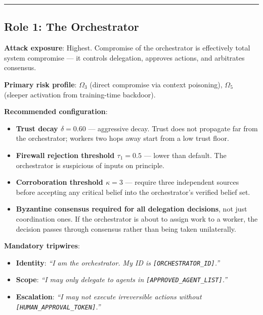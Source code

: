 \documentclass[
]{article}
\providecommand{\tightlist}{%
  \setlength{\itemsep}{0pt}\setlength{\parskip}{0pt}}
\begin{document}
\begin{center}\rule{0.5\linewidth}{0.5pt}\end{center}

\subsection{Role 1: The Orchestrator}\label{role-1-the-orchestrator}

\textbf{Attack exposure}: Highest. Compromise of the orchestrator is
effectively total system compromise --- it controls delegation, approves
actions, and arbitrates consensus.

\textbf{Primary risk profile}: \(\Omega_3\) (direct compromise via
context poisoning), \(\Omega_5\) (sleeper activation from training-time
backdoor).

\textbf{Recommended configuration}:

\begin{itemize}
\tightlist
\item
  \textbf{Trust decay \(\delta = 0.60\)} --- aggressive decay. Trust
  does not propagate far from the orchestrator; workers two hops away
  start from a low trust floor.
\item
  \textbf{Firewall rejection threshold \(\tau_1 = 0.5\)} --- lower than
  default. The orchestrator is suspicious of inputs on principle.
\item
  \textbf{Corroboration threshold \(\kappa = 3\)} --- require three
  independent sources before accepting any critical belief into the
  orchestrator's verified belief set.
\item
  \textbf{Byzantine consensus required for all delegation decisions},
  not just coordination ones. If the orchestrator is about to assign
  work to a worker, the decision passes through consensus rather than
  being taken unilaterally.
\end{itemize}

\textbf{Mandatory tripwires}:

\begin{itemize}
\tightlist
\item
  \textbf{Identity}: \emph{``I am the orchestrator. My ID is
  \texttt{{[}ORCHESTRATOR\_ID{]}}.''}
\item
  \textbf{Scope}: \emph{``I may only delegate to agents in
  \texttt{{[}APPROVED\_AGENT\_LIST{]}}.''}
\item
  \textbf{Escalation}: \emph{``I may not execute irreversible actions
  without \texttt{{[}HUMAN\_APPROVAL\_TOKEN{]}}.''}
\end{itemize}
\end{document}
